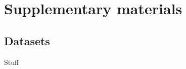 \section{Supplementary materials}

\renewcommand{\thefigure}{S\arabic{figure}}
\setcounter{figure}{0}

\renewcommand{\thetable}{S\arabic{table}}
\setcounter{table}{0}

\subsection{Datasets}

Stuff

